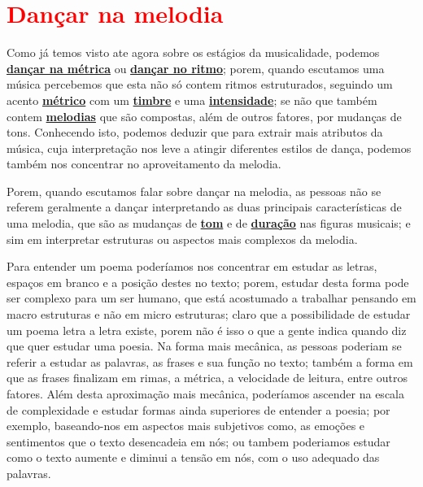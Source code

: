 


\section{\textcolor{red}{Dançar na melodia}}
\label{subsec:dancamelodia}

Como já temos visto ate agora sobre os estágios da musicalidade, 
podemos \hyperref[subsec:dancametrica]{\textbf{dançar na métrica}}  ou \hyperref[subsec:dancaritmo]{\textbf{dançar no ritmo}};
porem, quando escutamos uma música percebemos que esta não só contem ritmos estruturados, 
seguindo um acento \hyperref[def:Metrica]{\textbf{métrico}} com um \hyperref[sec:pos:timbre]{\textbf{timbre}} 
e uma \hyperref[sec:pos:Intensidade]{\textbf{intensidade}};
se não que também contem \hyperref[sec:pos:Melodia]{\textbf{melodias}} que são compostas, além de outros fatores, 
por mudanças de tons.
Conhecendo isto, 
podemos deduzir que para extrair mais atributos da música,
cuja interpretação nos leve a atingir diferentes estilos de dança,
podemos também nos concentrar no aproveitamento da melodia.


Porem, quando escutamos falar sobre dançar na melodia,
as pessoas não se referem geralmente a dançar interpretando as duas principais características de uma melodia,
que são as mudanças de \hyperref[sec:pos:Altura]{\textbf{tom}} e de
\hyperref[sec:pos:Duracion]{\textbf{duração}} nas figuras musicais;
e sim em interpretar estruturas ou aspectos mais complexos da melodia.


\begin{example}
Para entender um poema poderíamos nos concentrar em estudar as letras, 
espaços em branco  e a posição destes no texto;
porem, estudar desta forma pode ser complexo para um ser humano,
que está acostumado a trabalhar pensando em macro estruturas e não em micro estruturas;
claro que a possibilidade de estudar um poema letra a letra existe,
porem não é isso o que a gente indica quando diz que quer estudar uma poesia.
Na forma mais mecânica, 
as pessoas poderiam se referir a estudar as palavras, as frases e sua função no texto;
também a forma em que as frases finalizam em rimas, a métrica,
a velocidade de leitura, entre outros fatores.
Além desta aproximação mais mecânica, 
poderíamos ascender na escala de complexidade e estudar formas ainda superiores de entender a poesia;
por exemplo, baseando-nos em aspectos mais subjetivos como, 
as emoções e sentimentos  que o texto desencadeia em nós;
ou tambem poderiamos estudar como o texto aumente e diminui a tensão em nós,
 com o uso adequado das palavras.
\end{example}

